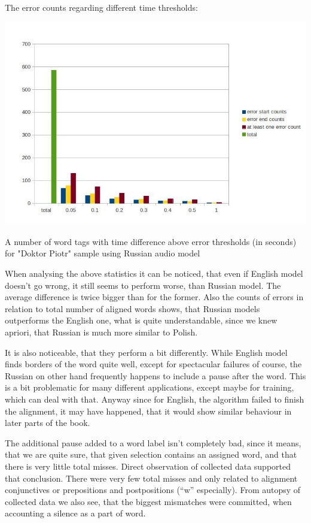 \documentclass[12pt,a4paper,english]{article}
\begin{document}
The error counts regarding different time thresholds:
\begin{center}
    \includegraphics[scale=0.7]{doktor_piotr_word_russian_results.jpg}
    \caption[]{A number of word tags with time difference above error thresholds (in seconds) for "Doktor Piotr" sample using Russian audio model}
\end{center}

\newpage
When analysing the above statistics it can be noticed, that even if English model doesn't go wrong, it still seems to perform worse, than Russian model. The average difference is twice bigger than for the former.  Also the counts of errors in relation to total number of aligned words shows, that Russian models outperforms the English one, what is quite understandable, since we knew apriori, that Russian is much more similar to Polish. \newline

It is also noticeable, that they perform a bit differently. While English model finds borders of the word quite well, except for spectacular failures of course, the Russian on other hand frequently happens to include a pause after the word. This is a bit problematic for many different applications, except maybe for training, which can deal with that. Anyway since for English, the algorithm failed to finish the alignment, it may have happened, that it would show similar behaviour in later parts of the book. \newline

The additional pause added to a word label isn't completely bad, since it means, that we are quite sure, that given selection contains an assigned word, and that there is very little total misses. Direct observation of collected data supported that conclusion. There were very few total misses and only related to alignment conjunctives or prepositions and postpositions (“w” especially).\newline
From autopsy of collected data we also see, that the biggest mismatches were committed, when accounting a silence as a part of word. \newline
\end{document}
